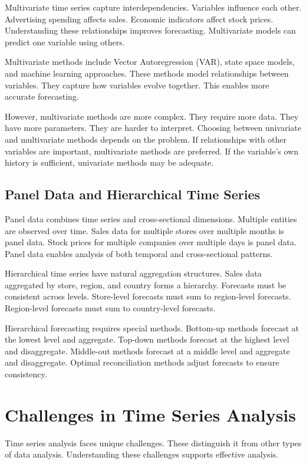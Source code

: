 Multivariate time series capture interdependencies. Variables influence each other. Advertising spending affects sales. Economic indicators affect stock prices. Understanding these relationships improves forecasting. Multivariate models can predict one variable using others.

Multivariate methods include Vector Autoregression (VAR), state space models, and machine learning approaches. These methods model relationships between variables. They capture how variables evolve together. This enables more accurate forecasting.

However, multivariate methods are more complex. They require more data. They have more parameters. They are harder to interpret. Choosing between univariate and multivariate methods depends on the problem. If relationships with other variables are important, multivariate methods are preferred. If the variable's own history is sufficient, univariate methods may be adequate.

\subsection{Panel Data and Hierarchical Time Series}

Panel data combines time series and cross-sectional dimensions. Multiple entities are observed over time. Sales data for multiple stores over multiple months is panel data. Stock prices for multiple companies over multiple days is panel data. Panel data enables analysis of both temporal and cross-sectional patterns.

Hierarchical time series have natural aggregation structures. Sales data aggregated by store, region, and country forms a hierarchy. Forecasts must be consistent across levels. Store-level forecasts must sum to region-level forecasts. Region-level forecasts must sum to country-level forecasts.

Hierarchical forecasting requires special methods. Bottom-up methods forecast at the lowest level and aggregate. Top-down methods forecast at the highest level and disaggregate. Middle-out methods forecast at a middle level and aggregate and disaggregate. Optimal reconciliation methods adjust forecasts to ensure consistency.

\section{Challenges in Time Series Analysis}

Time series analysis faces unique challenges. These distinguish it from other types of data analysis. Understanding these challenges supports effective analysis.


